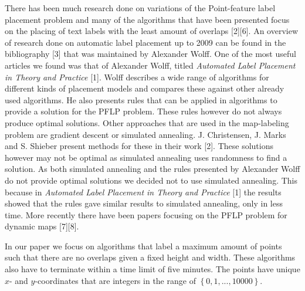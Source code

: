 \documentclass[crop=false,a4paper,oneside,11pt]{standalone}
\begin{document}
 There has been much research done on variations of the Point-feature label placement problem and many of the algorithms that have been presented focus on the placing of text labels with the least amount of overlaps [2][6]. An overview of research done on automatic label placement up to 2009 can be found in the bibliography [3] that was maintained by Alexander Wolff. One of the most useful articles we found was that of Alexander Wolff, titled \emph{Automated Label Placement in Theory and Practice} [1]. Wolff describes a wide range of algorithms for different kinds of placement models and compares these against other already used algorithms. He also presents rules that can be applied in algorithms to provide a solution for the PFLP problem. These rules however do not always produce optimal solutions. Other approaches that are used in the map-labeling problem are gradient descent or simulated annealing. J. Christensen, J. Marks and S. Shieber present methods for these in their work [2]. These solutions however may not be optimal as simulated annealing uses randomness to find a solution. As both simulated annealing and the rules presented by Alexander Wolff do not provide optimal solutions we decided not to use simulated annealing. This because in \emph{Automated Label Placement in Theory and Practice} [1] the results showed that the rules gave similar results to simulated annealing, only in less time.  More recently there have been papers focusing on the PFLP problem for dynamic maps [7][8].

 In our paper we focus on algorithms that label a maximum amount of points such that there are no overlaps given a fixed height and width. These algorithms also have to terminate within a time limit of five minutes. The points have unique $x$- and $y$-coordinates that are integers in the range of $\left\{0,1,...,10000\right\}$.
\end{document}

